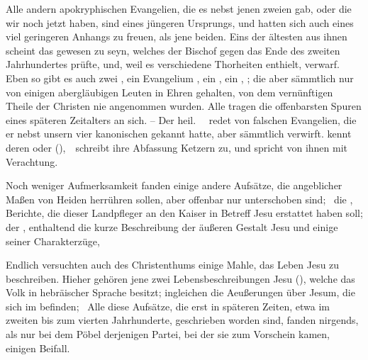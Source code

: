 \begin{aufza}
\item Alle andern apokryphischen Evangelien, die es nebst jenen zweien gab, oder die wir noch jetzt haben, sind eines jüngeren Ursprungs, und hatten sich auch eines viel geringeren Anhangs zu freuen, als jene beiden. Eins der ältesten aus ihnen scheint das  gewesen zu seyn, welches der Bischof  gegen das Ende des zweiten Jahrhundertes prüfte, und, weil es verschiedene Thorheiten enthielt, verwarf. Eben so gibt es auch zwei , ein Evangelium , ein , ein , \uam ; die aber sämmtlich nur von einigen abergläubigen Leuten in Ehren gehalten, von dem vernünftigen Theile der Christen nie angenommen wurden. Alle tragen die offenbarsten Spuren eines späteren Zeitalters an sich. -- Der heil.\  \zB\ redet von  falschen Evangelien, die er nebst unsern vier kanonischen gekannt hatte, aber sämmtlich verwirft.  kennt deren  oder  (),~\ schreibt ihre Abfassung Ketzern zu, und spricht von ihnen mit Verachtung.
\item Noch weniger Aufmerksamkeit fanden einige andere Aufsätze, die angeblicher Maßen von Heiden herrühren sollen, aber offenbar nur unterschoben sind; \zB\ die , Berichte, die dieser Landpfleger an den Kaiser  in Betreff Jesu erstattet haben soll; der , enthaltend die kurze Beschreibung der äußeren Gestalt Jesu und einige seiner Charakterzüge, \udgl\ 
\item Endlich versuchten auch  des Christenthums einige Mahle, das Leben Jesu zu beschreiben. Hieher gehören jene zwei Lebensbeschreibungen Jesu (), welche das  Volk in hebräischer Sprache besitzt; ingleichen die Aeußerungen über Jesum, die sich im  befinden; \uam\ Alle diese Aufsätze, die erst in späteren Zeiten, etwa im zweiten bis zum vierten Jahrhunderte, geschrieben worden sind, fanden nirgends, als nur bei dem Pöbel derjenigen Partei, bei der sie zum Vorschein kamen, einigen Beifall.

\end{aufza}
